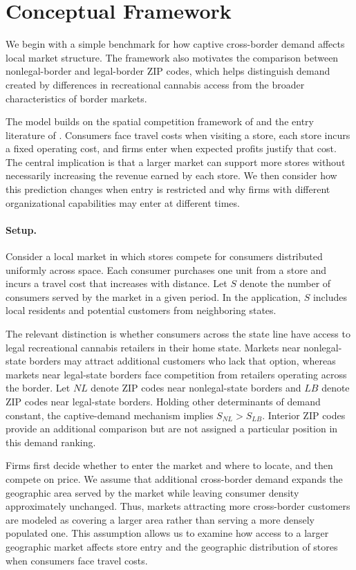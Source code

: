 \documentclass[english,12pt]{article}
\begin{document}
\section{Conceptual Framework}
\label{sec:framework}

We begin with a simple benchmark for how captive cross-border demand affects local market structure. The framework also motivates the comparison between nonlegal-border and legal-border ZIP codes, which helps distinguish demand created by differences in recreational cannabis access from the broader characteristics of border markets.

The model builds on the spatial competition framework of \citet{Salop1979} and the entry literature of \citet{BresnahanReiss1991}. Consumers face travel costs when visiting a store, each store incurs a fixed operating cost, and firms enter when expected profits justify that cost. The central implication is that a larger market can support more stores without necessarily increasing the revenue earned by each store. We then consider how this prediction changes when entry is restricted and why firms with different organizational capabilities may enter at different times.

\paragraph{Setup.}
Consider a local market in which stores compete for consumers distributed uniformly across space. Each consumer purchases one unit from a store and incurs a travel cost that increases with distance. Let $S$ denote the number of consumers served by the market in a given period. In the application, $S$ includes local residents and potential customers from neighboring states.

The relevant distinction is whether consumers across the state line have access to legal recreational cannabis retailers in their home state. Markets near nonlegal-state borders may attract additional customers who lack that option, whereas markets near legal-state borders face competition from retailers operating across the border. Let $NL$ denote ZIP codes near nonlegal-state borders and $LB$ denote ZIP codes near legal-state borders. Holding other determinants of demand constant, the captive-demand mechanism implies $S_{NL}>S_{LB}$. Interior ZIP codes provide an additional comparison but are not assigned a particular position in this demand ranking.

Firms first decide whether to enter the market and where to locate, and then compete on price. We assume that additional cross-border demand expands the geographic area served by the market while leaving consumer density approximately unchanged. Thus, markets attracting more cross-border customers are modeled as covering a larger area rather than serving a more densely populated one. This assumption allows us to examine how access to a larger geographic market affects store entry and the geographic distribution of stores when consumers face travel costs.
\end{document}
